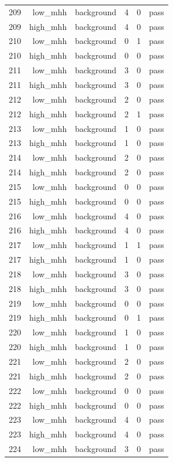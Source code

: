 \begin{table}[htbp]
{\begin{tabular}{lrrrrr}
209 & low\_mhh & background & 4 & 0 & pass \\
209 & high\_mhh & background & 4 & 0 & pass \\
210 & low\_mhh & background & 0 & 1 & pass \\
210 & high\_mhh & background & 0 & 0 & pass \\
211 & low\_mhh & background & 3 & 0 & pass \\
211 & high\_mhh & background & 3 & 0 & pass \\
212 & low\_mhh & background & 2 & 0 & pass \\
212 & high\_mhh & background & 2 & 1 & pass \\
213 & low\_mhh & background & 1 & 0 & pass \\
213 & high\_mhh & background & 1 & 0 & pass \\
214 & low\_mhh & background & 2 & 0 & pass \\
214 & high\_mhh & background & 2 & 0 & pass \\
215 & low\_mhh & background & 0 & 0 & pass \\
215 & high\_mhh & background & 0 & 0 & pass \\
216 & low\_mhh & background & 4 & 0 & pass \\
216 & high\_mhh & background & 4 & 0 & pass \\
217 & low\_mhh & background & 1 & 1 & pass \\
217 & high\_mhh & background & 1 & 0 & pass \\
218 & low\_mhh & background & 3 & 0 & pass \\
218 & high\_mhh & background & 3 & 0 & pass \\
219 & low\_mhh & background & 0 & 0 & pass \\
219 & high\_mhh & background & 0 & 1 & pass \\
220 & low\_mhh & background & 1 & 0 & pass \\
220 & high\_mhh & background & 1 & 0 & pass \\
221 & low\_mhh & background & 2 & 0 & pass \\
221 & high\_mhh & background & 2 & 0 & pass \\
222 & low\_mhh & background & 0 & 0 & pass \\
222 & high\_mhh & background & 0 & 0 & pass \\
223 & low\_mhh & background & 4 & 0 & pass \\
223 & high\_mhh & background & 4 & 0 & pass \\
224 & low\_mhh & background & 3 & 0 & pass \\

\end{tabular}}
\end{table}
